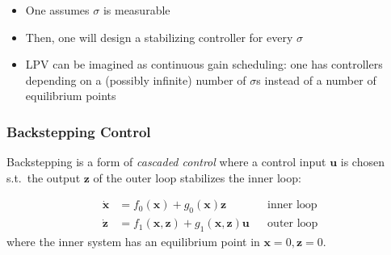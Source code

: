 \newpar{}

\begin{itemize}
    \item One assumes $\sigma$ is measurable
    \item Then, one will design a stabilizing controller for every $\sigma$
    \item LPV can be imagined as continuous gain scheduling: one has controllers depending on a (possibly infinite) number of $\sigma$s instead of a number of equilibrium points
\end{itemize}

\subsubsection{Backstepping Control}
Backstepping is a form of \textit{cascaded control} where a control input $\mathbf{u}$ is chosen s.t.\ the output $\mathbf{z}$ of the outer loop stabilizes the inner loop:

\noindent\begin{align*}
    \dot{\mathbf{x}} & = f_0(\mathbf{x}) + g_0(\mathbf{x})\mathbf{z}                         &  & \text{inner loop} \\
    \dot{\mathbf{z}} & = f_1(\mathbf{x},\mathbf{z}) + g_1(\mathbf{x}, \mathbf{z}) \mathbf{u} &  & \text{outer loop}
\end{align*}
where the inner system has an equilibrium point in $\mathbf{x}=0, \mathbf{z}=0$.

